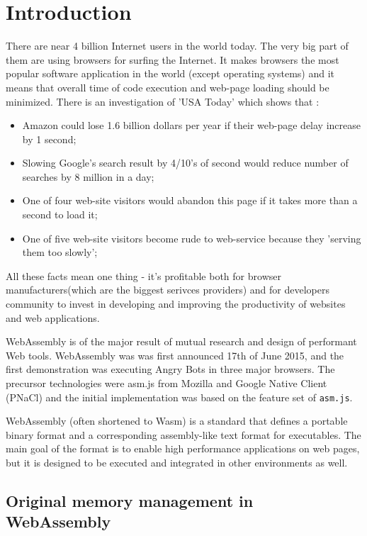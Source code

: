 \chapter*{Introduction}

There are near 4 billion Internet users in the world today. The very big part of them are using browsers for surfing the Internet.
It makes browsers the most popular software application in the world (except operating systems) and it means that overall time of code execution and web-page loading should be minimized. There is an investigation of 'USA Today' which shows that :

\begin{itemize}
 \item Amazon could lose 1.6 billion dollars per year if their web-page delay increase by 1 second;
 \item Slowing Google's search result by 4/10's of second would reduce number of searches by 8 million in a day;
 \item One of four web-site visitors would abandon this page if it takes more than a second to load it;
 \item One of five web-site visitors become rude to web-service because they 'serving them too slowly';
\end{itemize}

All these facts mean one thing - it’s profitable both for browser manufacturers(which are the biggest serivces providers) and for developers community to invest in developing and improving the productivity of websites and web applications.

WebAssembly is of the major result of mutual research and design of performant Web tools. WebAssembly was  was first announced 17th of June 2015, and the first demonstration was executing Angry Bots in three major browsers.
The precursor technologies were asm.js from Mozilla and Google Native Client (PNaCl) and the initial implementation was based on the feature set of \texttt{asm.js}. \cite{Wiki_Wasm}

WebAssembly (often shortened to Wasm) is a standard that defines a portable binary format and a corresponding assembly-like text format for executables. The main goal of the format is to enable high performance applications on web pages, but it is designed to be executed and integrated in other environments as well. \cite{Wiki_Wasm}

\section{Original memory management in WebAssembly}

